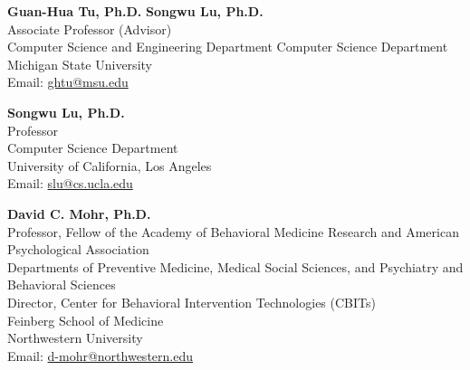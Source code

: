 
\iffalse
\textbf{Guan-Hua Tu, Ph.D.} \hfill \textbf{Songwu Lu, Ph.D.} \\
Associate Professor (Advisor) \\
Computer Science and Engineering Department \hfill Computer Science Department \\
Michigan State University \\
Email: \href{mailto:ghtu@msu.edu}{ghtu@msu.edu} 


\vspace{1mm}

\textbf{Songwu Lu, Ph.D.} \\
Professor \\
Computer Science Department \\
University of California, Los Angeles \\
Email: \href{mailto:slu@cs.ucla.edu}{slu@cs.ucla.edu} 


\vspace{1mm}

\textbf{David C. Mohr, Ph.D.} \\
Professor, Fellow of the Academy of Behavioral Medicine Research and American Psychological Association \\
Departments of Preventive Medicine, Medical Social Sciences, and Psychiatry and Behavioral Sciences \\
Director, Center for Behavioral Intervention Technologies (CBITs) \\
Feinberg School of Medicine \\
Northwestern University \\
Email: \href{mailto:d-mohr@northwestern.edu}{d-mohr@northwestern.edu} \\

